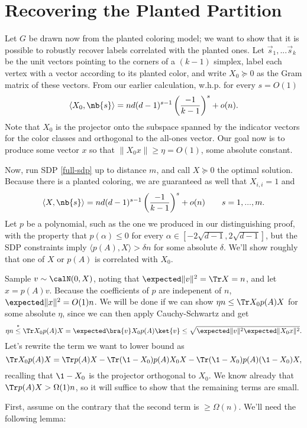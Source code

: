 \section{Recovering the Planted Partition} %
\label{sec:recovering_the_planted_partition}

Let $G$ be drawn now from the planted coloring model; we want to show that it is possible to robustly recover labels correlated with the planted ones. Let $\vec s_1,...\vec s_k$ be the unit vectors pointing to the corners of a $(k-1)$ simplex, label each vertex with a vector according to its planted color, and write $X_0 \succeq 0$ as the Gram matrix of these vectors. From our earlier calculation, w.h.p. for every $s = O(1)$
\[
	\langle X_0,\nb{s} \rangle = n d(d-1)^{s-1} \left(\frac{-1}{k-1}\right)^s + o(n).
\]
Note that $X_0$ is the projector onto the subspace spanned by the indicator vectors for the color classes and orthogonal to the all-ones vector. Our goal now is to produce some vector $x$ so that $\|X_0 x\| \ge \eta = O(1)$, some absolute constant.

Now, run SDP \eqref{full-sdp} up to distance $m$, and call $X \succeq 0$ the optimal solution. Because there is a planted coloring, we are guaranteed as well that $X_{i,i} = 1$ and
$$
	\langle X, \nb{s} \rangle = n d(d-1)^{s-1}\left(\frac{-1}{k-1}\right)^s + o(n) \qquad s = 1,...,m.
$$
Let $p$ be a polynomial, such as the one we produced in our distinguishing proof, with the property that $p(\alpha) \le 0$ for every $\alpha \in [-2\sqrt{d-1},2\sqrt{d-1}]$, but the SDP constraints imply $\langle p(A),X \rangle > \delta n$ for some absolute $\delta$. We'll show roughly that one of $X$ or $p(A)$ is correlated with $X_0$.

Sample $v \sim \calN(0,X)$, noting that $\expected \|v\|^2 = \Tr X = n$, and let $x = p(A)v$. Because the coefficients of $p$ are indepenent of $n$, $\expected\|x\|^2 = O(1) n$. We will be done if we can show $\eta n \le \Tr X_0 p(A) X$ for some absolute $\eta$, since we can then apply Cauchy-Schwartz and get
\[
	\eta n \overset{\ast}\le \Tr X_0 p(A)X = \expected\bra{v}X_0 p(A)\ket{v} \le \sqrt{\expected\|v\|^2 \expected\|X_0 x\|^2}.
\]
Let's rewrite the term we want to lower bound as
\[
	\Tr X_0 p(A) X = \Tr p(A)X - \Tr(\1 - X_0)p(A)X_0 X - \Tr(\1 - X_0)p(A)(\1 - X_0)X,
\]
recalling that $\1 - X_0$ is the projector orthogonal to $X_0$. We know already that $\Tr p(A) X > \Omega(1) n$, so it will suffice to show that the remaining terms are small.

First, assume on the contrary that the second term is $\ge \Omega(n)$. We'll need the following lemma:

